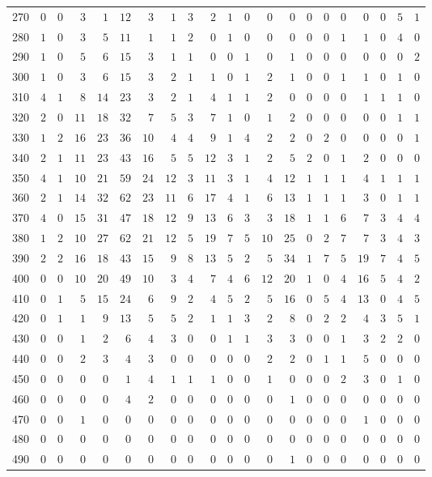 \begin{sidewaystable}[!tbp]
\begin{center}
\begin{tabular}{lrrrrrrrrrrrrrrrrrrrr}
270&$0$&$0$&$ 3$&$ 1$&$12$&$ 3$&$ 1$&$3$&$ 2$&$1$&$0$&$ 0$&$ 0$&$0$&$0$&$0$&$ 0$&$0$&$5$&$1$\tabularnewline
280&$1$&$0$&$ 3$&$ 5$&$11$&$ 1$&$ 1$&$2$&$ 0$&$1$&$0$&$ 0$&$ 0$&$0$&$0$&$1$&$ 1$&$0$&$4$&$0$\tabularnewline
290&$1$&$0$&$ 5$&$ 6$&$15$&$ 3$&$ 1$&$1$&$ 0$&$0$&$1$&$ 0$&$ 1$&$0$&$0$&$0$&$ 0$&$0$&$0$&$2$\tabularnewline
300&$1$&$0$&$ 3$&$ 6$&$15$&$ 3$&$ 2$&$1$&$ 1$&$0$&$1$&$ 2$&$ 1$&$0$&$0$&$1$&$ 1$&$0$&$1$&$0$\tabularnewline
310&$4$&$1$&$ 8$&$14$&$23$&$ 3$&$ 2$&$1$&$ 4$&$1$&$1$&$ 2$&$ 0$&$0$&$0$&$0$&$ 1$&$1$&$1$&$0$\tabularnewline
320&$2$&$0$&$11$&$18$&$32$&$ 7$&$ 5$&$3$&$ 7$&$1$&$0$&$ 1$&$ 2$&$0$&$0$&$0$&$ 0$&$0$&$1$&$1$\tabularnewline
330&$1$&$2$&$16$&$23$&$36$&$10$&$ 4$&$4$&$ 9$&$1$&$4$&$ 2$&$ 2$&$0$&$2$&$0$&$ 0$&$0$&$0$&$1$\tabularnewline
340&$2$&$1$&$11$&$23$&$43$&$16$&$ 5$&$5$&$12$&$3$&$1$&$ 2$&$ 5$&$2$&$0$&$1$&$ 2$&$0$&$0$&$0$\tabularnewline
350&$4$&$1$&$10$&$21$&$59$&$24$&$12$&$3$&$11$&$3$&$1$&$ 4$&$12$&$1$&$1$&$1$&$ 4$&$1$&$1$&$1$\tabularnewline
360&$2$&$1$&$14$&$32$&$62$&$23$&$11$&$6$&$17$&$4$&$1$&$ 6$&$13$&$1$&$1$&$1$&$ 3$&$0$&$1$&$1$\tabularnewline
370&$4$&$0$&$15$&$31$&$47$&$18$&$12$&$9$&$13$&$6$&$3$&$ 3$&$18$&$1$&$1$&$6$&$ 7$&$3$&$4$&$4$\tabularnewline
380&$1$&$2$&$10$&$27$&$62$&$21$&$12$&$5$&$19$&$7$&$5$&$10$&$25$&$0$&$2$&$7$&$ 7$&$3$&$4$&$3$\tabularnewline
390&$2$&$2$&$16$&$18$&$43$&$15$&$ 9$&$8$&$13$&$5$&$2$&$ 5$&$34$&$1$&$7$&$5$&$19$&$7$&$4$&$5$\tabularnewline
400&$0$&$0$&$10$&$20$&$49$&$10$&$ 3$&$4$&$ 7$&$4$&$6$&$12$&$20$&$1$&$0$&$4$&$16$&$5$&$4$&$2$\tabularnewline
410&$0$&$1$&$ 5$&$15$&$24$&$ 6$&$ 9$&$2$&$ 4$&$5$&$2$&$ 5$&$16$&$0$&$5$&$4$&$13$&$0$&$4$&$5$\tabularnewline
420&$0$&$1$&$ 1$&$ 9$&$13$&$ 5$&$ 5$&$2$&$ 1$&$1$&$3$&$ 2$&$ 8$&$0$&$2$&$2$&$ 4$&$3$&$5$&$1$\tabularnewline
430&$0$&$0$&$ 1$&$ 2$&$ 6$&$ 4$&$ 3$&$0$&$ 0$&$1$&$1$&$ 3$&$ 3$&$0$&$0$&$1$&$ 3$&$2$&$2$&$0$\tabularnewline
440&$0$&$0$&$ 2$&$ 3$&$ 4$&$ 3$&$ 0$&$0$&$ 0$&$0$&$0$&$ 2$&$ 2$&$0$&$1$&$1$&$ 5$&$0$&$0$&$0$\tabularnewline
450&$0$&$0$&$ 0$&$ 0$&$ 1$&$ 4$&$ 1$&$1$&$ 1$&$0$&$0$&$ 1$&$ 0$&$0$&$0$&$2$&$ 3$&$0$&$1$&$0$\tabularnewline
460&$0$&$0$&$ 0$&$ 0$&$ 4$&$ 2$&$ 0$&$0$&$ 0$&$0$&$0$&$ 0$&$ 1$&$0$&$0$&$0$&$ 0$&$0$&$0$&$0$\tabularnewline
470&$0$&$0$&$ 1$&$ 0$&$ 0$&$ 0$&$ 0$&$0$&$ 0$&$0$&$0$&$ 0$&$ 0$&$0$&$0$&$0$&$ 1$&$0$&$0$&$0$\tabularnewline
480&$0$&$0$&$ 0$&$ 0$&$ 0$&$ 0$&$ 0$&$0$&$ 0$&$0$&$0$&$ 0$&$ 0$&$0$&$0$&$0$&$ 0$&$0$&$0$&$0$\tabularnewline
490&$0$&$0$&$ 0$&$ 0$&$ 0$&$ 0$&$ 0$&$0$&$ 0$&$0$&$0$&$ 0$&$ 1$&$0$&$0$&$0$&$ 0$&$0$&$0$&$0$\tabularnewline
\hline
\end{tabular}
\end{center}
\end{sidewaystable}

